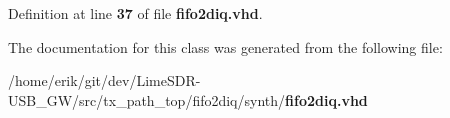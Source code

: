 Definition at line {\bf 37} of file {\bf fifo2diq.\+vhd}.



The documentation for this class was generated from the following file\+:\begin{DoxyCompactItemize}
\item 
/home/erik/git/dev/\+Lime\+S\+D\+R-\/\+U\+S\+B\+\_\+\+G\+W/src/tx\+\_\+path\+\_\+top/fifo2diq/synth/{\bf fifo2diq.\+vhd}\end{DoxyCompactItemize}
